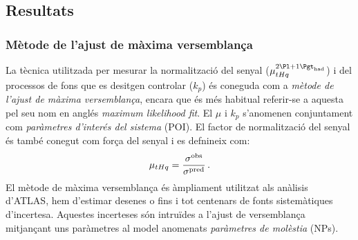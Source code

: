 \subsection{Resultats}
\label{sec:resum:Resultats}


\subsubsection{Mètode de l'ajust de màxima versemblança}
\label{sec:resum:Resultats:Fit}
La tècnica utilitzada per mesurar la normalització del senyal ($\mu_{\tHq}^{\dileptau}$) i del processos de fons que es desitgen
controlar ($k_p$) és coneguda com a \textit{mètode de l'ajust de màxima versemblança}, encara que és més habitual referir-se a aquesta pel
seu nom en anglés \textit{maximum likelihood fit}.  El $\mu$ i $k_p$ s'anomenen conjuntament com \textit{paràmetres d'interés del sistema} (POI).  
El factor de normalització del senyal és també conegut com força del senyal i es defnineix com:
\begin{equation*}
	\mu_{tHq} =\frac{\sigma^{\text{obs}}}{\sigma^{\text{pred}}}\,.
\end{equation*}
El mètode de màxima versemblança és àmpliament utilitzat als anàlisis d'ATLAS, hem d'estimar desenes o fins i 
tot centenars de fonts sistemàtiques d'incertesa. Aquestes incerteses són intruïdes a l'ajust de versemblança 
mitjançant uns paràmetres al model anomenats \textit{paràmetres de molèstia} (NPs). %

